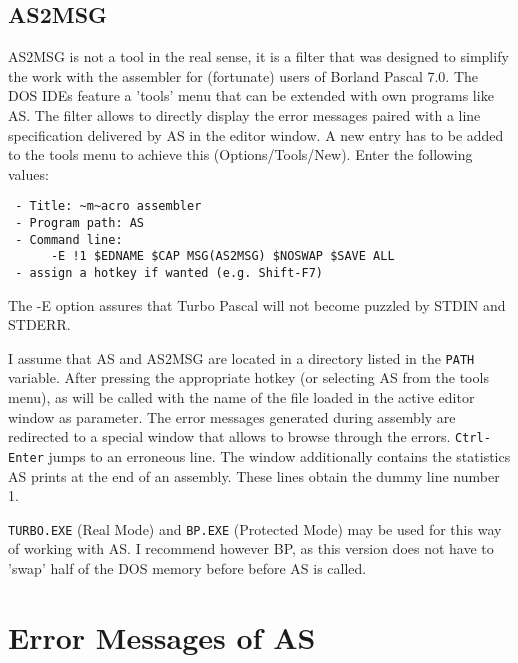 \documentclass[12pt,twoside]{report}
\newcommand{\tty}[1]{{\tt #1}}
\newcommand{\asname}{{AS}}
\begin{document}

\section{AS2MSG}

AS2MSG is not a tool in the real sense, it is a filter that was
designed to simplify the work with the assembler for (fortunate)
users of Borland Pascal 7.0.  The DOS IDEs feature a 'tools' menu
that can be extended with own programs like \asname{}.  The filter allows to
directly display the error messages paired with a line
specification delivered by \asname{} in the editor window.  A new entry has
to be added to the tools menu to achieve this (Options/Tools/New).
Enter the following values:
\begin{verbatim}
 - Title: ~m~acro assembler
 - Program path: AS
 - Command line:
      -E !1 $EDNAME $CAP MSG(AS2MSG) $NOSWAP $SAVE ALL
 - assign a hotkey if wanted (e.g. Shift-F7)
\end{verbatim}
The -E option assures that Turbo Pascal will not become puzzled by
STDIN and STDERR.

I assume that \asname{} and AS2MSG are located in a directory listed in the
\tty{PATH} variable.  After pressing the appropriate hotkey (or selecting
\asname{} from the tools menu), as will be called with the name of the file
loaded in the active editor window as parameter.  The error messages
generated during assembly are redirected to a special window that
allows to browse through the errors.  \tty{Ctrl-Enter} jumps to an
erroneous line.  The window additionally contains the statistics \asname{}
prints at the end of an assembly.  These lines obtain the dummy line
number 1.

\tty{TURBO.EXE} (Real Mode) and \tty{BP.EXE} (Protected Mode) may be used for
this way of working with \asname{}.  I recommend however BP, as this version
does not have to 'swap' half of the DOS memory before before \asname{} is
called.

\appendix

\cleardoublepage
\chapter{Error Messages of \asname{}}
\label{ChapErrMess}
\end{document}
